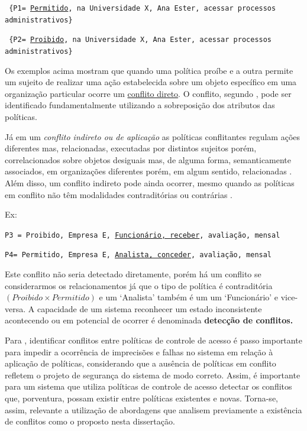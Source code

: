 \documentclass[
	12pt,				%
	openright,			%
	oneside,			%
	a4paper,			%
	english,			%
	french,				%
	spanish,			%
	brazil				%
	]{abntex2}
\begin{document}
{\scriptsize \texttt{ \{P1= {\underline{Permitido}, na Universidade X, Ana Ester, acessar processos administrativos\} }}}

{\scriptsize \texttt{ \{P2= {\underline{Proibido}, na Universidade X, Ana Ester, acessar processos administrativos\} }}}

Os exemplos acima mostram que quando uma política proíbe e a outra permite um sujeito de realizar uma ação estabelecida sobre um objeto específico em uma organização particular ocorre um \underline{conflito direto}. O conflito, segundo , pode ser identificado fundamentalmente utilizando a sobreposição dos atributos das políticas. 

Já em um \textit{conflito indireto ou de aplicação} as políticas conflitantes regulam ações diferentes mas, relacionadas, executadas por distintos sujeitos porém, correlacionados sobre objetos desiguais mas, de alguma forma, semanticamente associados, em organizações diferentes porém, em algum sentido, relacionadas  \cite{cuppens_high_2007}. %
Além disso, um conflito indireto pode ainda ocorrer, mesmo quando as políticas em conflito não têm modalidades contraditórias ou contrárias \cite{sloman_security_2002} \cite{lupu_conflicts_1999}.

Ex:

{\scriptsize \texttt{P3 = {Proibido, Empresa E, \underline{Funcionário, receber}, avaliação, mensal}}}

{\scriptsize \texttt{P4= {Permitido, Empresa E, \underline{Analista, conceder}, avaliação, mensal}}}

Este conflito não seria detectado diretamente, porém há um conflito se considerarmos os relacionamentos já que o tipo de política é contraditória $(Proibido \times Permitido)$ e um `Analista' também é um um `Funcionário' e vice-versa. A capacidade de um sistema reconhecer um estado inconsistente acontecendo ou em potencial de ocorrer é denominada \textbf{detecção de conflitos.}

Para , identificar conflitos entre políticas de controle de acesso é passo importante para impedir a ocorrência de imprecisões e falhas no sistema em relação à aplicação de políticas, considerando que a ausência de políticas em conflito refletem o projeto de segurança do sistema de modo correto. Assim, é importante para um sistema que utiliza políticas de controle de acesso detectar os conflitos que, porventura, possam existir entre políticas existentes e novas. Torna-se, assim, relevante a utilização de abordagens que analisem previamente a existência de conflitos como o proposto nesta dissertação.
\end{document}
